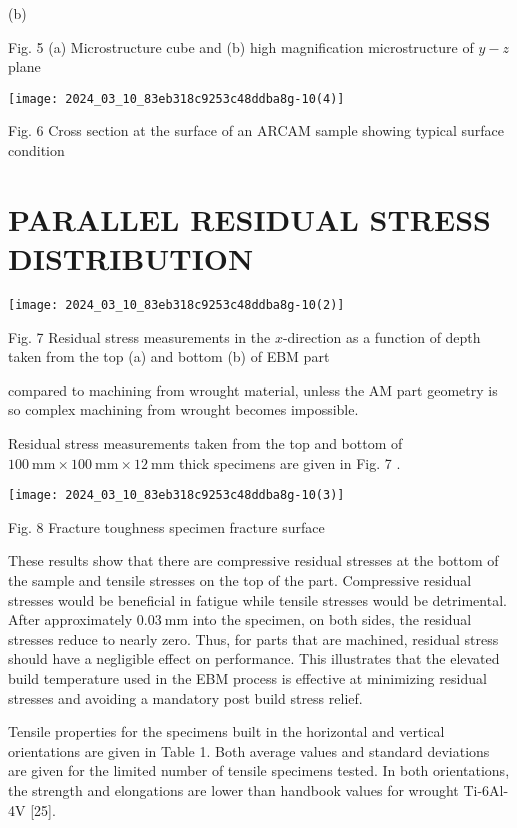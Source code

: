 \documentclass[10pt]{article}
\begin{document}
(b)

Fig. 5 (a) Microstructure cube and (b) high magnification microstructure of $y-z$ plane

\begin{center}
\texttt{[image: 2024\_03\_10\_83eb318c9253c48ddba8g-10(4)]}
\end{center}

Fig. 6 Cross section at the surface of an ARCAM sample showing typical surface condition

\section*{PARALLEL RESIDUAL STRESS DISTRIBUTION}
\begin{center}
\texttt{[image: 2024\_03\_10\_83eb318c9253c48ddba8g-10(2)]}
\end{center}

Fig. 7 Residual stress measurements in the $x$-direction as a function of depth taken from the top (a) and bottom (b) of EBM part

compared to machining from wrought material, unless the AM part geometry is so complex machining from wrought becomes impossible.

Residual stress measurements taken from the top and bottom of $100 \mathrm{~mm} \times 100 \mathrm{~mm} \times 12 \mathrm{~mm}$ thick specimens are given in Fig. 7 .

\begin{center}
\texttt{[image: 2024\_03\_10\_83eb318c9253c48ddba8g-10(3)]}
\end{center}

Fig. 8 Fracture toughness specimen fracture surface

These results show that there are compressive residual stresses at the bottom of the sample and tensile stresses on the top of the part. Compressive residual stresses would be beneficial in fatigue while tensile stresses would be detrimental. After approximately $0.03 \mathrm{~mm}$ into the specimen, on both sides, the residual stresses reduce to nearly zero. Thus, for parts that are machined, residual stress should have a negligible effect on performance. This illustrates that the elevated build temperature used in the EBM process is effective at minimizing residual stresses and avoiding a mandatory post build stress relief.

Tensile properties for the specimens built in the horizontal and vertical orientations are given in Table 1. Both average values and standard deviations are given for the limited number of tensile specimens tested. In both orientations, the strength and elongations are lower than handbook values for wrought Ti-6Al-4V [25].
\end{document}
